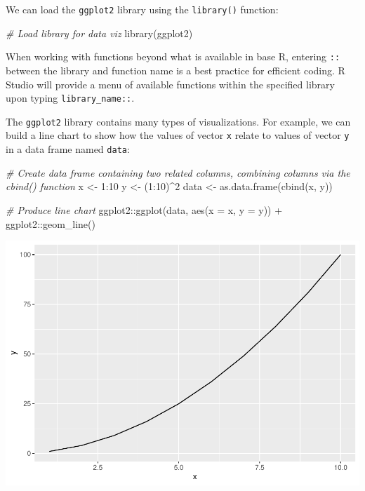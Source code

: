 \documentclass[
]{book}
\newenvironment{Shaded}{\begin{snugshade}}{\end{snugshade}}
\newcommand{\AttributeTok}[1]{\textcolor[rgb]{0.77,0.63,0.00}{#1}}
\newcommand{\CommentTok}[1]{\textcolor[rgb]{0.56,0.35,0.01}{\textit{#1}}}
\newcommand{\DecValTok}[1]{\textcolor[rgb]{0.00,0.00,0.81}{#1}}
\newcommand{\FunctionTok}[1]{\textcolor[rgb]{0.00,0.00,0.00}{#1}}
\newcommand{\NormalTok}[1]{#1}
\newcommand{\OtherTok}[1]{\textcolor[rgb]{0.56,0.35,0.01}{#1}}
\newcommand{\SpecialCharTok}[1]{\textcolor[rgb]{0.00,0.00,0.00}{#1}}
\begin{document}
We can load the \texttt{ggplot2} library using the \texttt{library()} function:

\begin{Shaded}
\begin{Highlighting}[]
\CommentTok{\# Load library for data viz}
\FunctionTok{library}\NormalTok{(ggplot2)}
\end{Highlighting}
\end{Shaded}

When working with functions beyond what is available in base R, entering \texttt{::} between the library and function name is a best practice for efficient coding. R Studio will provide a menu of available functions within the specified library upon typing \texttt{library\_name::}.

The \texttt{ggplot2} library contains many types of visualizations. For example, we can build a line chart to show how the values of vector \texttt{x} relate to values of vector \texttt{y} in a data frame named \texttt{data}:

\begin{Shaded}
\begin{Highlighting}[]
\CommentTok{\# Create data frame containing two related columns, combining columns via the cbind() function}
\NormalTok{x }\OtherTok{\textless{}{-}} \DecValTok{1}\SpecialCharTok{:}\DecValTok{10}
\NormalTok{y }\OtherTok{\textless{}{-}}\NormalTok{ (}\DecValTok{1}\SpecialCharTok{:}\DecValTok{10}\NormalTok{)}\SpecialCharTok{\^{}}\DecValTok{2}
\NormalTok{data }\OtherTok{\textless{}{-}} \FunctionTok{as.data.frame}\NormalTok{(}\FunctionTok{cbind}\NormalTok{(x, y))}

\CommentTok{\# Produce line chart}
\NormalTok{ggplot2}\SpecialCharTok{::}\FunctionTok{ggplot}\NormalTok{(data, }\FunctionTok{aes}\NormalTok{(}\AttributeTok{x =}\NormalTok{ x, }\AttributeTok{y =}\NormalTok{ y)) }\SpecialCharTok{+}
\NormalTok{ggplot2}\SpecialCharTok{::}\FunctionTok{geom\_line}\NormalTok{()}
\end{Highlighting}
\end{Shaded}

\includegraphics{The_Fundamentals_of_People_Analytics_files/figure-latex/unnamed-chunk-51-1.pdf}
\end{document}
